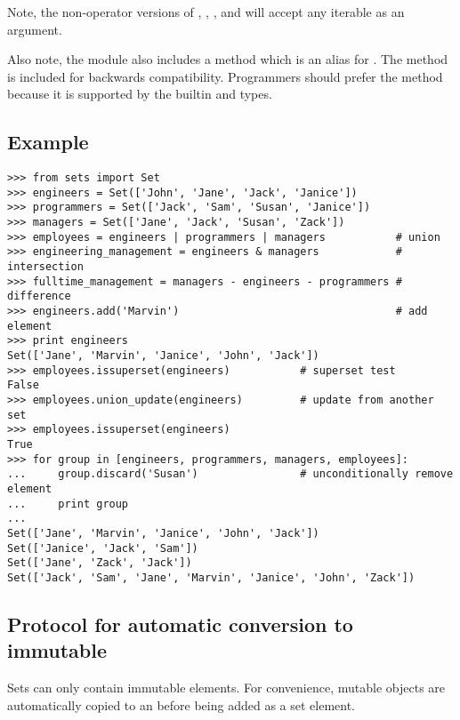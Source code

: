 Note, the non-operator versions of ,
, , and
 will accept any iterable as
an argument.

Also note, the module also includes a  method
which is an alias for .  The method is included for
backwards compatibility.  Programmers should prefer the
 method because it is supported by the builtin
 and  types.

\subsection{Example \label{set-example}}

\begin{verbatim}
>>> from sets import Set
>>> engineers = Set(['John', 'Jane', 'Jack', 'Janice'])
>>> programmers = Set(['Jack', 'Sam', 'Susan', 'Janice'])
>>> managers = Set(['Jane', 'Jack', 'Susan', 'Zack'])
>>> employees = engineers | programmers | managers           # union
>>> engineering_management = engineers & managers            # intersection
>>> fulltime_management = managers - engineers - programmers # difference
>>> engineers.add('Marvin')                                  # add element
>>> print engineers
Set(['Jane', 'Marvin', 'Janice', 'John', 'Jack'])
>>> employees.issuperset(engineers)           # superset test
False
>>> employees.union_update(engineers)         # update from another set
>>> employees.issuperset(engineers)
True
>>> for group in [engineers, programmers, managers, employees]:
...     group.discard('Susan')                # unconditionally remove element
...     print group
...
Set(['Jane', 'Marvin', 'Janice', 'John', 'Jack'])
Set(['Janice', 'Jack', 'Sam'])
Set(['Jane', 'Zack', 'Jack'])
Set(['Jack', 'Sam', 'Jane', 'Marvin', 'Janice', 'John', 'Zack'])
\end{verbatim}


\subsection{Protocol for automatic conversion to immutable
            \label{immutable-transforms}}

Sets can only contain immutable elements.  For convenience, mutable
 objects are automatically copied to an 
before being added as a set element.

